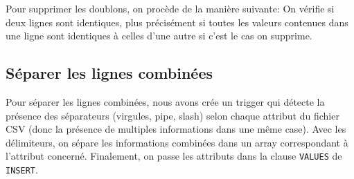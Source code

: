 \documentclass[11pt]{article}
\begin{document}
Pour supprimer les doublons, on procède de la manière suivante: On
vérifie si deux lignes sont identiques, plus précisément si toutes les
valeurs contenues dans une ligne sont identiques à celles d'une autre si
c'est le cas on supprime.

    \hypertarget{suxe9parer-les-lignes-combinuxe9es}{%
\subsection{Séparer les lignes
combinées}\label{suxe9parer-les-lignes-combinuxe9es}}

Pour séparer les lignes combinées, nous avons crée un trigger qui
détecte la présence des séparateurs (virgules, pipe, slash) selon chaque
attribut du fichier CSV (donc la présence de multiples informations dans
une même case). Avec les délimiteurs, on sépare les informations
combinées dans un array correspondant à l'attribut concerné. Finalement,
on passe les attributs dans la clause \texttt{VALUES} de
\texttt{INSERT}.
\end{document}
